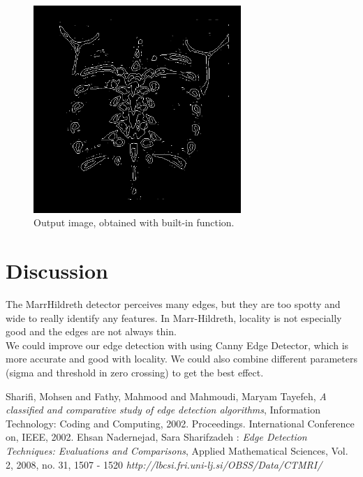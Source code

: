 \documentclass[a4paper,10pt]{article}
\begin{document}
\begin{figure}[H]
  \caption{Output image, obtained with built-in function.}
  \centering
    \includegraphics[width=0.7\textwidth]{out4.png}
\end{figure}

\section{Discussion}
The MarrHildreth detector perceives many edges, but they are too spotty and wide to really
identify any features. In Marr-Hildreth, locality is not especially good and the edges are not always thin. \\
We could improve our edge detection with using Canny Edge Detector, which is more accurate and good with locality.
We could also combine different parameters (sigma and threshold in zero crossing) to get the best effect.
\begin{thebibliography}{9}

 Sharifi, Mohsen and Fathy, Mahmood and Mahmoudi, Maryam Tayefeh,
  \emph{A classified and comparative study of edge detection algorithms},
  Information Technology: Coding and Computing, 2002. Proceedings. International Conference on, IEEE,
  2002.
 Ehsan Nadernejad, Sara Sharifzadeh : 
  \emph{Edge Detection Techniques: Evaluations and Comparisons},
  Applied Mathematical Sciences, Vol. 2, 2008, no. 31, 1507 - 1520 
  \emph{http://lbcsi.fri.uni-lj.si/OBSS/Data/CTMRI/}


\end{thebibliography}
\end{document}

